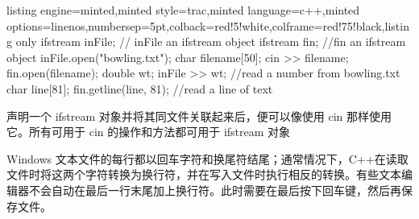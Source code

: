 \begin{tcblisting}{listing engine=minted,minted style=trac,minted language=c++,minted options={linenos,numbersep=5pt},colback=red!5!white,colframe=red!75!black,listing only}
	ifstream inFile; // inFile an ifstream object
	ifstream fin; //fin an ifstream object
	inFile.open("bowling.txt");
	char filename[50];
	cin >> filename;
	fin.open(filename);
	double wt;
	inFile >> wt; //read a number from bowling.txt
	char line[81];
	fin.getline(line, 81); //read a line of text
\end{tcblisting}
{\color{red}声明一个 ifstream 对象并将其同文件关联起来后，便可以像使用 cin 那样使用它。所有可用于 cin 的操作和方法都可用于 ifstream 对象}
\begin{marker}
	Windows 文本文件的每行都以回车字符和换尾符结尾；通常情况下，C++在读取文件时将这两个字符转换为换行符，并在写入文件时执行相反的转换。有些文本编辑器不会自动在最后一行末尾加上换行符。此时需要在最后按下回车键，然后再保存文件。
\end{marker}